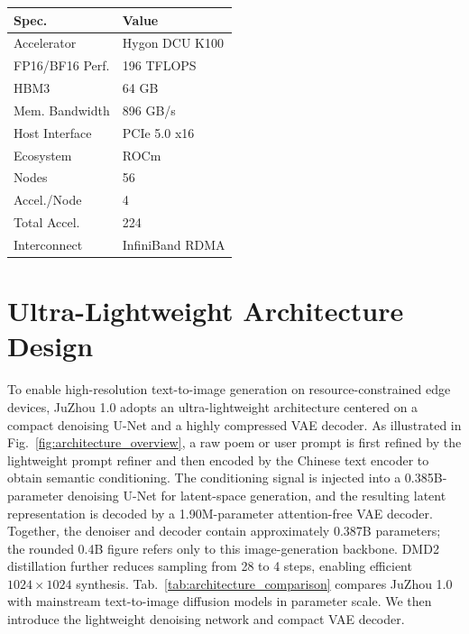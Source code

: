 \begin{table}[t]
\begin{minipage}[t]{0.30\linewidth}
        \renewcommand{\arraystretch}{1.09}
        \begin{tabular*}{\linewidth}{@{\extracolsep{\fill}}ll@{}}
            \toprule
            \textbf{Spec.} & \textbf{Value} \\
            \midrule
            Accelerator & Hygon DCU K100 \\
            FP16/BF16 Perf. & 196 TFLOPS \\
            HBM3 & 64 GB \\
            Mem. Bandwidth & 896 GB/s \\
            Host Interface & PCIe 5.0 x16 \\
            Ecosystem & ROCm \\
            \midrule
            Nodes & 56 \\
            Accel./Node & 4 \\
            Total Accel. & 224 \\
            Interconnect & InfiniBand RDMA \\
            \bottomrule
        \end{tabular*}
    \end{minipage}

    \renewcommand{\arraystretch}{1.0}
\end{table}

\section{Ultra-Lightweight Architecture Design}

To enable high-resolution text-to-image generation on resource-constrained edge devices, JuZhou 1.0 adopts an ultra-lightweight architecture centered on a compact denoising U-Net and a highly compressed VAE decoder. As illustrated in Fig.~\ref{fig:architecture_overview}, a raw poem or user prompt is first refined by the lightweight prompt refiner and then encoded by the Chinese text encoder to obtain semantic conditioning. 
The conditioning signal is injected into a 0.385B-parameter denoising U-Net for latent-space generation, and the resulting latent representation is decoded by a 1.90M-parameter attention-free VAE decoder. Together, the denoiser and decoder contain approximately 0.387B parameters; the rounded 0.4B figure refers only to this image-generation backbone.
DMD2 distillation further reduces sampling from 28 to 4 steps, enabling efficient $1024 \times 1024$ synthesis.
Tab.~\ref{tab:architecture_comparison} compares JuZhou 1.0 with mainstream text-to-image diffusion models in parameter scale. We then introduce the lightweight denoising network and compact VAE decoder.

